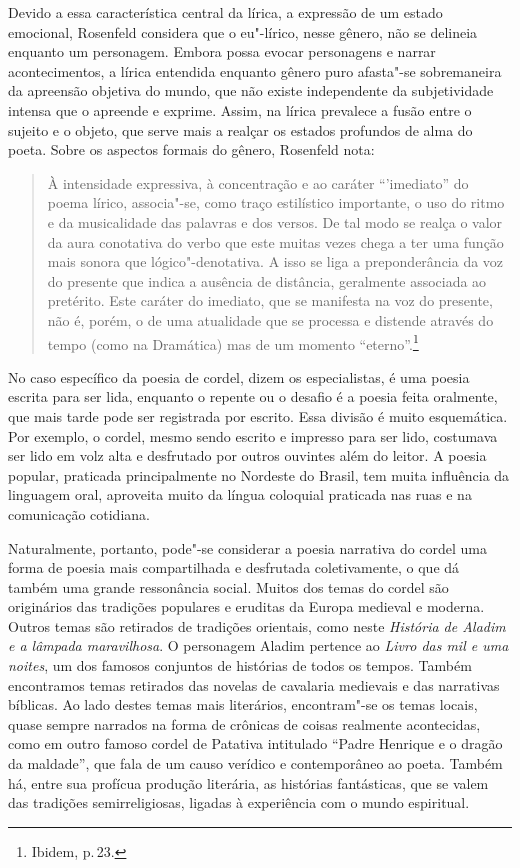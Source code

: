 \documentclass[11pt]{extarticle}
\begin{document}
Devido a essa característica central da lírica, a expressão de um estado emocional, Rosenfeld considera que o eu"-lírico, nesse gênero, não se delineia enquanto um personagem. Embora possa evocar personagens e narrar acontecimentos, a lírica entendida enquanto gênero puro afasta"-se sobremaneira da apreensão objetiva do mundo, que não existe independente da subjetividade intensa que o apreende e exprime. Assim, na lírica prevalece a fusão entre o sujeito e o objeto, que serve mais a realçar os estados profundos de alma do poeta.
Sobre os aspectos formais do gênero, Rosenfeld nota:

\begin{quote}
À intensidade expressiva, à concentração e ao caráter ``'imediato'' do poema lírico, associa"-se, como traço estilístico importante, o uso do ritmo e da musicalidade das palavras e dos versos. De tal modo se realça o valor da aura conotativa do verbo que este muitas vezes chega a ter uma função mais sonora que lógico"-denotativa. A isso se liga a preponderância da voz do presente que indica a ausência de distância, geralmente associada ao pretérito. Este caráter do imediato, que se manifesta na voz do presente, não é, porém, o de uma atualidade que se processa e distende através do tempo (como na Dramática) mas de um momento ``eterno''.\footnote{Ibidem, p.\,23.}
\end{quote}

No caso específico da poesia de cordel, dizem os especialistas, é uma poesia escrita para
ser lida, enquanto o repente ou o desafio é a poesia feita oralmente, que mais tarde pode
ser registrada por escrito. Essa divisão é muito esquemática. Por exemplo, o
cordel, mesmo sendo escrito e impresso para ser lido, costumava ser lido em
volz alta e desfrutado por outros ouvintes além do leitor. A poesia popular,
praticada principalmente no Nordeste do Brasil, tem muita influência da
linguagem oral, aproveita muito da língua coloquial praticada nas ruas e na
comunicação cotidiana. 

Naturalmente, portanto, pode"-se considerar a poesia narrativa do cordel uma
forma de poesia mais compartilhada e desfrutada coletivamente, o que dá também
uma grande ressonância social. Muitos dos temas do cordel são originários das
tradições populares e eruditas da Europa medieval e moderna. Outros temas são
retirados de tradições orientais, como neste \textit{História de
Aladim e a lâmpada maravilhosa}. O personagem Aladim pertence ao \textit{Livro das mil
e uma noites}, um dos famosos conjuntos de histórias de todos os tempos. Também
encontramos temas retirados das novelas de cavalaria medievais e das narrativas
bíblicas. Ao lado destes temas mais literários, encontram"-se os temas locais,
quase sempre narrados na forma de crônicas de coisas realmente acontecidas,
como em outro famoso cordel de Patativa intitulado  “Padre Henrique e o dragão da maldade”, que fala de um causo verídico e contemporâneo ao poeta. Também há, entre sua profícua produção literária, as histórias
fantásticas, que se valem das tradições semirreligiosas, ligadas à experiência
com o mundo espiritual. 
\end{document}
